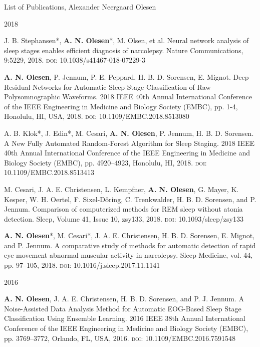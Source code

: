 \documentclass{resume} %
\begin{document}
\begin{rSection}{List of Publications, Alexander Neergaard Olesen}
	\begin{rSubsection}{2018}{}{}{}
	    \item J. B. Stephansen\mbox{*}, \textbf{A. N. Olesen}\mbox{*}, M. Olsen, et al. Neural network analysis of sleep stages enables efficient diagnosis of narcolepsy. Nature Communications, 9:5229, 2018. \textsc{doi}: 10.1038/s41467-018-07229-3 \medskip
	    
	    \item \textbf{A. N. Olesen}, P. Jennum, P. E. Peppard, H. B. D. Sorensen, E. Mignot. Deep Residual Networks for Automatic Sleep Stage Classification of Raw Polysomnographic Waveforms. 2018 IEEE 40th Annual International Conference of the IEEE Engineering in Medicine and Biology Society (EMBC), pp. 1-4, Honolulu, HI, USA, 2018. \textsc{doi}: 10.1109/EMBC.2018.8513080\medskip
	    
	    \item A. B. Klok\mbox{*}, J. Edin\mbox{*}, M. Cesari, \textbf{A. N. Olesen}, P. Jennum, H. B. D. Sorensen. A New Fully Automated Random-Forest Algorithm for Sleep Staging. 2018 IEEE 40th Annual International Conference of the IEEE Engineering in Medicine and Biology Society (EMBC), pp. 4920–4923, Honolulu, HI, 2018. \textsc{doi}: 10.1109/EMBC.2018.8513413 \medskip
	    
	    \item M. Cesari, J. A. E. Christensen, L. Kempfner, \textbf{A. N. Olesen}, G. Mayer, K. Kesper, W. H. Oertel, F. Sixel-Döring, C. Trenkwalder, H. B. D. Sorensen, and P. Jennum. Comparison of computerized methods for REM sleep without atonia detection. Sleep, Volume 41, Issue 10, zsy133, 2018. \textsc{doi}: 10.1093/sleep/zsy133 \medskip
	    
	    \item \textbf{A. N. Olesen}\mbox{*}, M. Cesari\mbox{*}, J. A. E. Christensen, H. B. D. Sorensen, E. Mignot, and P. Jennum. A comparative study of methods for automatic detection of rapid eye movement abnormal muscular activity in narcolepsy. Sleep Medicine, vol. 44, pp. 97–105, 2018. \textsc{doi}: 10.1016/j.sleep.2017.11.1141
	\end{rSubsection}
	
	\begin{rSubsection}{2016}{}{}{}
	    \item \textbf{A. N. Olesen}, J. A. E. Christensen, H. B. D. Sorensen, and P. J. Jennum. A Noise-Assisted Data Analysis Method for Automatic EOG-Based Sleep Stage Classification Using Ensemble Learning. 2016 IEEE 38th Annual International Conference of the IEEE Engineering in Medicine and Biology Society (EMBC), pp. 3769–3772, Orlando, FL, USA, 2016. \textsc{doi}:  10.1109/EMBC.2016.7591548
	\end{rSubsection}
	

\end{rSection}
\end{document}
